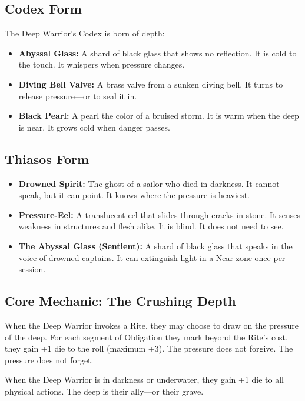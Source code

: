 \subsection{Codex Form}

The Deep Warrior's Codex is born of depth:

\begin{itemize}
\item \textbf{Abyssal Glass:} A shard of black glass that shows no reflection. It is cold to the touch. It whispers when pressure changes.
\item \textbf{Diving Bell Valve:} A brass valve from a sunken diving bell. It turns to release pressure—or to seal it in.
\item \textbf{Black Pearl:} A pearl the color of a bruised storm. It is warm when the deep is near. It grows cold when danger passes.
\end{itemize}

\subsection{Thiasos Form}

\begin{itemize}
\item \textbf{Drowned Spirit:} The ghost of a sailor who died in darkness. It cannot speak, but it can point. It knows where the pressure is heaviest.
\item \textbf{Pressure-Eel:} A translucent eel that slides through cracks in stone. It senses weakness in structures and flesh alike. It is blind. It does not need to see.
\item \textbf{The Abyssal Glass (Sentient):} A shard of black glass that speaks in the voice of drowned captains. It can extinguish light in a Near zone once per session.
\end{itemize}

\subsection{Core Mechanic: The Crushing Depth}

When the Deep Warrior invokes a Rite, they may choose to draw on the pressure of the deep. For each segment of Obligation they mark beyond the Rite's cost, they gain +1 die to the roll (maximum +3). The pressure does not forgive. The pressure does not forget.

When the Deep Warrior is in darkness or underwater, they gain +1 die to all physical actions. The deep is their ally—or their grave.

